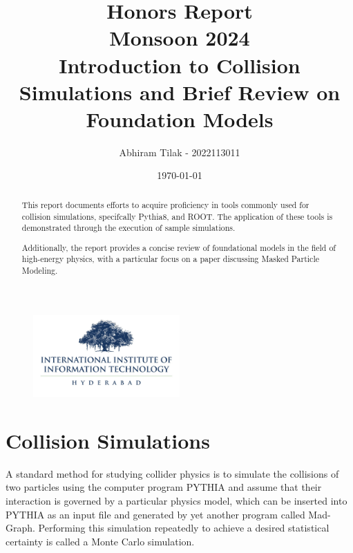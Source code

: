 \documentclass[letterpaper,12pt]{article}
\date{\today}
\newcommand\authormark[1]{\textsuperscript{#1}}
\begin{document}
\begin{spacing}{1.125}

\begin{figure}[!ht]
\includegraphics[width=0.5\textwidth]{iiith_logo.png}
\end{figure}
\vspace{0.5cm}
\title{\Large{Honors Report} \\ \normalsize{Monsoon 2024} \\ \vspace{1cm} \Huge{Introduction to Collision
Simulations and Brief Review on Foundation Models}}
\vspace{1cm}
\author{Abhiram Tilak - 2022113011}
\address{\authormark{*}International Instituite of Information Technology, Hyderabad}
\vspace{1cm}

\begin{abstract}
This report documents efforts to acquire proficiency in tools commonly used for collision
simulations, specifcally Pythia8, and ROOT. The application of these tools is
demonstrated through the execution of sample simulations.

Additionally, the report provides a concise review of foundational models in the field
of high-energy physics, with a particular focus on a paper discussing Masked Particle Modeling.
\end{abstract}

\pagebreak





\tableofcontents
\listoffigures
\lstlistoflistings


\section{Collision Simulations}


A standard method for studying collider physics is to simulate the collisions
of two particles using the computer program PYTHIA and assume that their
interaction is governed by a particular physics model, which can be inserted into
PYTHIA as an input file and generated by yet another program called Mad-
Graph. Performing this simulation repeatedly to achieve a desired statistical
certainty is called a Monte Carlo simulation.


\end{spacing}
\end{document}
